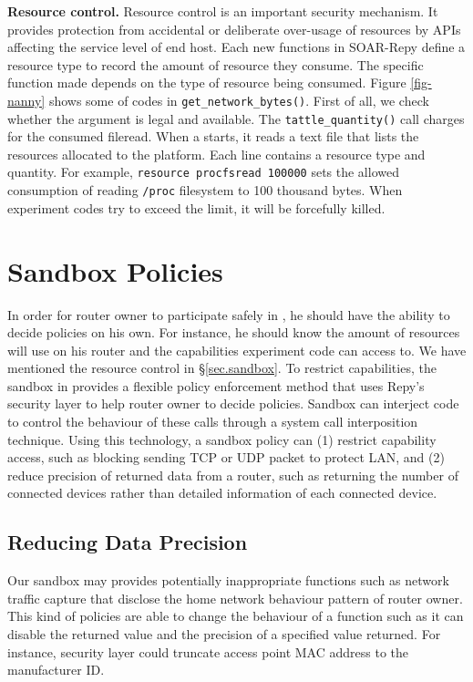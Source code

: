 \textbf{Resource control.} Resource control is an important security mechanism. It provides protection from accidental or deliberate over-usage of resources by APIs affecting the service level of end host. Each new functions in SOAR-Repy define a resource type to record the amount of resource they consume. The specific function made depends on the type of resource being consumed. Figure \ref{fig-nanny} shows some of codes in \texttt{get\_network\_bytes()}. First of all, we check whether the argument is legal and available. The \texttt{tattle\_quantity()} call charges for the consumed fileread. When a \sysname starts, it reads a text file that lists the resources allocated to the platform. Each line contains a resource type and quantity. For example, \texttt{resource procfsread 100000} sets the allowed consumption of reading \texttt{/proc} filesystem to 100 thousand bytes. When experiment codes try to exceed the limit, it will be forcefully killed.

\section{Sandbox Policies}
\label{sec.policy}
In order for router owner to participate safely in \sysname, he should have the ability to decide policies on his own. For instance, he should know the amount of resources \sysname will use on his router and the capabilities experiment code can access to. We have mentioned the resource control in \S{\ref{sec.sandbox}}. To restrict capabilities, the sandbox in \sysname provides a flexible policy enforcement method that uses Repy's security layer to help router owner to decide policies. Sandbox can interject code to control the behaviour of these calls through a system call interposition technique. Using this technology, a sandbox policy can (1) restrict capability access, such as blocking sending TCP or UDP packet to protect LAN, and (2) reduce precision of returned data from a router, such as returning the number of connected devices rather than detailed information of each connected device.

\subsection{Reducing Data Precision}
Our sandbox may provides potentially inappropriate functions such as network traffic capture that disclose the home network behaviour pattern of router owner. This kind of policies are able to change the behaviour of a function such as it can disable the returned value and the precision of a specified value returned. For instance, security layer could truncate access point MAC address to the manufacturer ID.


